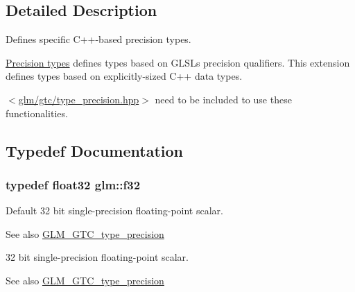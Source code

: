 \subsection{Detailed Description}
Defines specific C++-\/based precision types. 

\hyperlink{group__core__precision}{Precision types} defines types based on G\+L\+SL\textquotesingle{}s precision qualifiers. This extension defines types based on explicitly-\/sized C++ data types.

$<$\hyperlink{type__precision_8hpp}{glm/gtc/type\+\_\+precision.\+hpp}$>$ need to be included to use these functionalities. 

\subsection{Typedef Documentation}
\subsubsection[{\texorpdfstring{f32}{f32}}]{\setlength{\rightskip}{0pt plus 5cm}typedef float32 {\bf glm\+::f32}}\hypertarget{group__gtc__type__precision_ga0ec999b57f5330d9021256e96038df04}{}\label{group__gtc__type__precision_ga0ec999b57f5330d9021256e96038df04}
Default 32 bit single-\/precision floating-\/point scalar. \begin{DoxySeeAlso}{See also}
\hyperlink{group__gtc__type__precision}{G\+L\+M\+\_\+\+G\+T\+C\+\_\+type\+\_\+precision}
\end{DoxySeeAlso}
32 bit single-\/precision floating-\/point scalar. \begin{DoxySeeAlso}{See also}
\hyperlink{group__gtc__type__precision}{G\+L\+M\+\_\+\+G\+T\+C\+\_\+type\+\_\+precision} 
\end{DoxySeeAlso}
